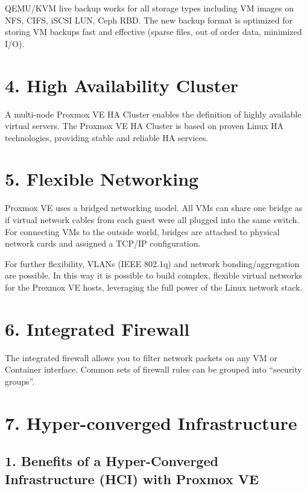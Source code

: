 QEMU/KVM live backup works for all storage types including VM images on NFS, CIFS, iSCSI LUN, Ceph RBD. The new backup format is optimized for storing VM backups fast and effective (sparse files, out of order data, minimized I/O).


\section{4. High Availability Cluster}

A multi-node Proxmox VE HA Cluster enables the definition of highly available virtual servers. The Proxmox VE HA Cluster is based on proven Linux HA technologies, providing stable and reliable HA services.


\section{5. Flexible Networking}

Proxmox VE uses a bridged networking model. All VMs can share one bridge as if virtual network cables from each guest were all plugged into the same switch. For connecting VMs to the outside world, bridges are attached to physical network cards and assigned a TCP/IP configuration.

For further flexibility, VLANs (IEEE 802.1q) and network bonding/aggregation are possible. In this way it is possible to build complex, flexible virtual networks for the Proxmox VE hosts, leveraging the full power of the Linux network stack.


\section{6. Integrated Firewall}

The integrated firewall allows you to filter network packets on any VM or Container interface. Common sets of firewall rules can be grouped into “security groups”.


\section{7. Hyper-converged Infrastructure}

\subsection{1. Benefits of a Hyper-Converged Infrastructure (HCI) with Proxmox VE}

